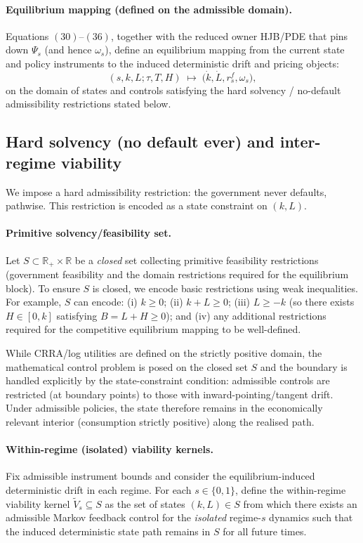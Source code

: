 \documentclass{article}
\begin{document}
\paragraph{Equilibrium mapping (defined on the admissible domain).}
Equations \((30)\)--\((36)\), together with the reduced owner HJB/PDE that pins down $\Psi_s$ (and hence $\omega_s$), define an equilibrium mapping from the current state and policy instruments to the induced deterministic drift and pricing objects:
\[
(s,k,L;\tau,T,H)\;\mapsto\;\big(\dot{k},\dot{L},r^f_s,\omega_s\big),
\]
on the domain of states and controls satisfying the hard solvency / no-default admissibility restrictions stated below.

\subsection{Hard solvency (no default ever) and inter-regime viability}

We impose a hard admissibility restriction: the government never defaults, pathwise. This restriction is encoded as a
state constraint on $(k,L)$.

\paragraph{Primitive solvency/feasibility set.}
Let $S\subset \mathbb R_+\times \mathbb R$ be a \emph{closed} set collecting primitive feasibility restrictions (government
feasibility and the domain restrictions required for the equilibrium block). To ensure $S$ is closed, we encode basic
restrictions using weak inequalities. For example, $S$ can encode: (i) $k\ge 0$; (ii) $k+L\ge 0$; (iii) $L\ge -k$
(so there exists $H\in[0,k]$ satisfying $B=L+H\ge 0$); and (iv) any additional restrictions required for the competitive
equilibrium mapping to be well-defined.

While CRRA/log utilities are defined on the strictly positive domain, the mathematical control problem is posed on the
closed set $S$ and the boundary is handled explicitly by the state-constraint condition: admissible controls are restricted
(at boundary points) to those with inward-pointing/tangent drift. Under admissible policies, the state therefore remains
in the economically relevant interior (consumption strictly positive) along the realised path.

\paragraph{Within-regime (isolated) viability kernels.}
Fix admissible instrument bounds and consider the equilibrium-induced deterministic drift in each regime. For each
$s\in\{0,1\}$, define the within-regime viability kernel $\widetilde V_s\subseteq S$ as the set of states $(k,L)\in S$
from which there exists an admissible Markov feedback control for the \emph{isolated} regime-$s$ dynamics such that the
induced deterministic state path remains in $S$ for all future times.
\end{document}
